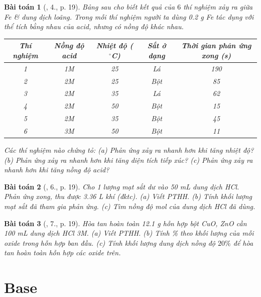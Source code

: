 \documentclass{article}
\newtheorem{baitoan}{Bài toán}
\begin{document}
\begin{baitoan}[\cite{SGK_Hoa_Hoc_9}, 4., p. 19]
	Bảng sau cho biết kết quả của $6$ thí nghiệm xảy ra giữa {\rm Fe} \& dung dịch {\rm{}} loãng. Trong mỗi thí nghiệm người ta dùng {\rm0.2 g Fe} tác dụng với thể tích bằng nhau của acid, nhưng có nồng độ khác nhau.
	\begin{table}[H]
		\centering
		\begin{tabular}{|c|c|c|c|c|}
			\hline
			Thí nghiệm & Nồng độ acid & Nhiệt độ (${}^\circ$C) & Sắt ở dạng & Thời gian phản ứng xong (s) \\
			\hline
			1 & 1M & 25 & Lá & 190 \\
			\hline
			2 & 2M & 25 & Bột & 85 \\
			\hline
			3 & 2M & 35 & Lá & 62 \\
			\hline
			4 & 2M & 50 & Bột & 15 \\
			\hline
			5 & 2M & 35 & Bột & 45 \\
			\hline
			6 & 3M & 50 & Bột & 11 \\
			\hline
		\end{tabular}
	\end{table}
	\noindent Các thí nghiệm nào chứng tỏ: (a) Phản ứng xảy ra nhanh hơn khi tăng nhiệt độ? (b) Phản ứng xảy ra nhanh hơn khi tăng diện tích tiếp xúc? (c) Phản ứng xảy ra nhanh hơn khi tăng nồng độ acid?
\end{baitoan}

\begin{baitoan}[\cite{SGK_Hoa_Hoc_9}, 6., p. 19]
	Cho 1 lượng mạt sắt dư vào {\rm50 mL} dung dịch {\rm HCl}. Phản ứng xong, thu được {\rm3.36 L} khí (đktc). (a) Viết PTHH. (b) Tính khối lượng mạt sắt đã tham gia phản ứng. (c) Tìm nồng độ mol của dung dịch {\rm HCl} đã dùng.
\end{baitoan}

\begin{baitoan}[\cite{SGK_Hoa_Hoc_9}, 7., p. 19]
	Hòa tan hoàn toàn {\rm12.1 g} hỗn hợp bột {\rm CuO, ZnO} cần {\rm100 mL} dung dịch {\rm HCl 3M}. (a) Viết {\rm PTHH}. (b) Tính \% theo khối lượng của mỗi oxide trong hỗn hợp ban đầu. (c) Tính khối lượng dung dịch {\rm{}} nồng độ $20\%$ để hòa tan hoàn toàn hỗn hợp các oxide trên.
\end{baitoan}


\section{Base}
\end{document}
